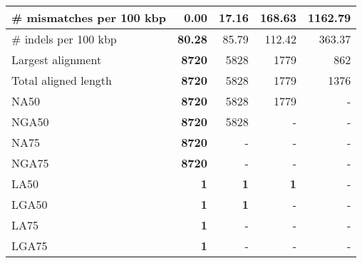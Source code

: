 \documentclass[12pt,a4paper]{article}
\begin{document}
\begin{table}[ht]
\begin{center}
\begin{tabular}{|l*{4}{|r}|}
\# mismatches per 100 kbp & {\bf 0.00} & 17.16 & 168.63 & 1162.79 \\ \hline
\# indels per 100 kbp & {\bf 80.28} & 85.79 & 112.42 & 363.37 \\ \hline
Largest alignment & {\bf 8720} & 5828 & 1779 & 862 \\ \hline
Total aligned length & {\bf 8720} & 5828 & 1779 & 1376 \\ \hline
NA50 & {\bf 8720} & 5828 & 1779 & - \\ \hline
NGA50 & {\bf 8720} & 5828 & - & - \\ \hline
NA75 & {\bf 8720} & - & - & - \\ \hline
NGA75 & {\bf 8720} & - & - & - \\ \hline
LA50 & {\bf 1} & {\bf 1} & {\bf 1} & - \\ \hline
LGA50 & {\bf 1} & {\bf 1} & - & - \\ \hline
LA75 & {\bf 1} & - & - & - \\ \hline
LGA75 & {\bf 1} & - & - & - \\ \hline
\end{tabular}
\end{center}
\end{table}
\end{document}
